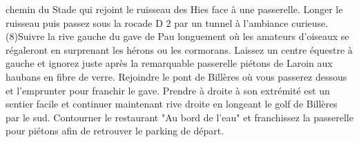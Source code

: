 \documentclass{article}
\begin{document}
                                chemin du Stade qui rejoint le ruisseau des Hies face à une
                                passerelle. Longer le ruisseau puis passez sous la rocade D 2 par un
                                tunnel à l'ambiance curieuse. \\(8)\indent Suivre la rive gauche du gave de Pau longuement où les
                                amateurs d'oiseaux se régaleront en surprenant les hérons ou les
                                cormorans. Laissez un centre équestre à gauche et ignorez juste
                                après la remarquable passerelle piétons de Laroin aux haubans en
                                fibre de verre. Rejoindre le pont de Billères où vous passerez
                                dessous et l'emprunter pour franchir le gave. Prendre à droite à son
                                extrémité est un sentier facile et continuer maintenant rive droite
                                en longeant le golf de Billères par le sud. Contourner le restaurant
                                "Au bord de l'eau" et franchissez la passerelle pour piétons afin de
                                retrouver le parking de départ. \\
\end{document}
